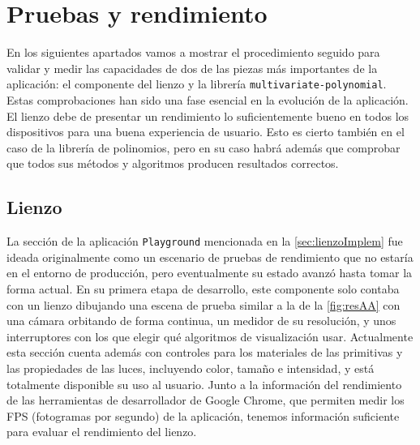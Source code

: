 \chapter{Pruebas y rendimiento}\label{chapter4}
En los siguientes apartados vamos a mostrar el procedimiento seguido para validar y medir las capacidades de dos de las piezas más importantes de la aplicación: el componente del lienzo y la librería \texttt{multivariate-polynomial}.  Estas comprobaciones han sido una fase esencial en la evolución de la aplicación. El lienzo debe de presentar un rendimiento lo suficientemente bueno en todos los dispositivos para una buena experiencia de usuario. Esto es cierto también en el caso de la librería de polinomios, pero en su caso habrá además que comprobar que todos sus métodos y algoritmos producen resultados correctos.

\section{Lienzo}
La sección de la aplicación \texttt{Playground} mencionada en la \autoref{sec:lienzoImplem} fue ideada originalmente como un escenario de pruebas de rendimiento que no estaría en el entorno de producción, pero eventualmente su estado avanzó hasta tomar la forma actual. En su primera etapa de desarrollo, este componente solo contaba con un lienzo dibujando una escena de prueba similar a la de la \autoref{fig:resAA} con una cámara orbitando de forma continua, un medidor de su resolución, y unos interruptores con los que elegir qué algoritmos de visualización usar. Actualmente esta sección cuenta además con controles para los materiales de las primitivas y las propiedades de las luces, incluyendo color, tamaño e intensidad, y está totalmente disponible su uso al usuario. Junto a la información del rendimiento de las herramientas de desarrollador de Google Chrome, que permiten medir los FPS (fotogramas por segundo) de la aplicación, tenemos información suficiente para evaluar el rendimiento del lienzo.\newline

